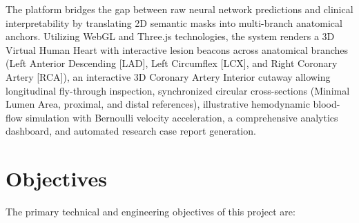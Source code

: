The platform bridges the gap between raw neural network predictions and clinical interpretability by translating 2D semantic masks into multi-branch anatomical anchors. Utilizing WebGL and Three.js technologies, the system renders a 3D Virtual Human Heart with interactive lesion beacons across anatomical branches (Left Anterior Descending [LAD], Left Circumflex [LCX], and Right Coronary Artery [RCA]), an interactive 3D Coronary Artery Interior cutaway allowing longitudinal fly-through inspection, synchronized circular cross-sections (Minimal Lumen Area, proximal, and distal references), illustrative hemodynamic blood-flow simulation with Bernoulli velocity acceleration, a comprehensive analytics dashboard, and automated research case report generation.

\section{Objectives}
The primary technical and engineering objectives of this project are:

